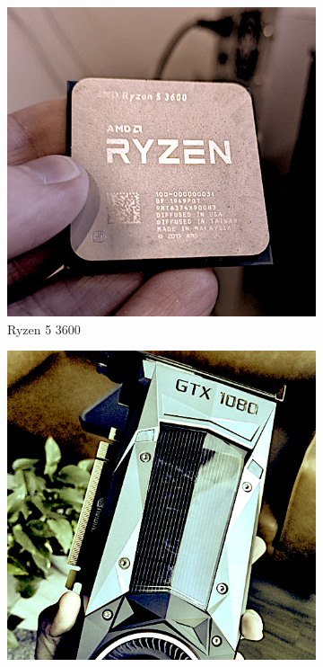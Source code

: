 \documentclass{article}
\begin{document}
\begin{figure}[t!]
\centering
\begin{subfigure}[t]{0.32\columnwidth}
    \centering
    \includegraphics[width=1\textwidth]{CPU.png}
    \caption{Ryzen 5 3600\label{subfig:cpu}}
\end{subfigure}
\begin{subfigure}[t]{0.32\columnwidth}
    \centering
    \includegraphics[width=1\textwidth]{GPU.png}

\end{subfigure}
\end{figure}
\end{document}
